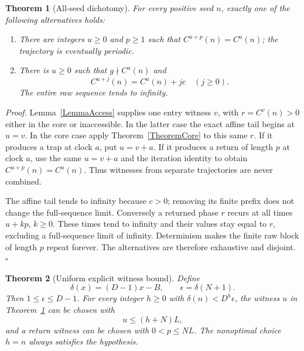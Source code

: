 \documentclass[11pt,letterpaper]{article}
\newtheorem{theorem}{Theorem}
\newenvironment{proof}{\noindent\textit{Proof.}}{\hfill\(\square\)}
\begin{document}
\begin{theorem}[All-seed dichotomy]\label{TheoremOutcome}
For every positive seed $n$, exactly one of the following alternatives holds:
\begin{enumerate}
\item There are integers $u\ge0$ and $p\ge1$ such that
$C^{u+p}(n)=C^u(n)$; the trajectory is eventually periodic.
\item There is $u\ge0$ such that $g\nmid C^u(n)$ and
\[
 C^{u+j}(n)=C^u(n)+jc\quad(j\ge0).
\]
The entire raw sequence tends to infinity.
\end{enumerate}
\end{theorem}

\begin{proof}
Lemma~\ref{LemmaAccess} supplies one entry witness $v$, with
$r=C^v(n)>0$ either in the core or inaccessible. In the latter case the
exact affine tail begins at $u=v$. In the core case apply
Theorem~\ref{TheoremCore} to this same $r$. If it produces a trap at clock
$a$, put $u=v+a$. If it produces a return of length $p$ at clock $a$, use
the same $u=v+a$ and the iteration identity to obtain
$C^{u+p}(n)=C^u(n)$. Thus witnesses from separate trajectories are never
combined.

The affine tail tends to infinity because $c>0$; removing its finite prefix
does not change the full-sequence limit. Conversely a returned phase $r$
recurs at all times $u+kp$, $k\ge0$. These times tend to infinity and their
values stay equal to $r$, excluding a full-sequence limit of infinity.
Determinism makes the finite raw block of length $p$ repeat forever.
The alternatives are therefore exhaustive and disjoint.
\end{proof}

\begin{theorem}[Uniform explicit witness bound]\label{TheoremBudget}
Define
\[
 \delta(x)=(D-1)x-B,\qquad \epsilon=\delta(N+1).
\]
Then $1\le\epsilon\le D-1$. For every integer $h\ge0$ with
$\delta(n)<D^h\epsilon$, the witness $u$ in Theorem~\ref{TheoremOutcome}
can be chosen with
\[
 u\le(h+N)L,
\]
and a return witness can be chosen with $0<p\le NL$.
The nonoptimal choice $h=n$ always satisfies the hypothesis.
\end{theorem}
\end{document}

